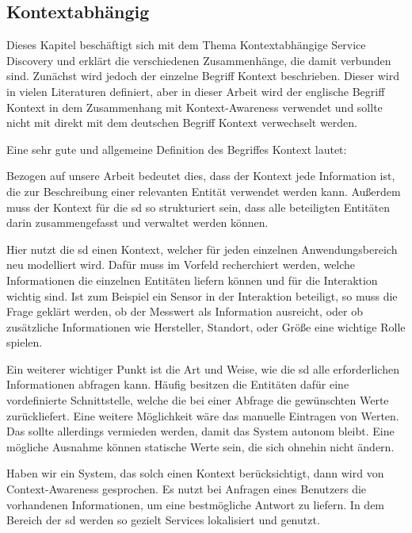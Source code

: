 \subsection{Kontextabhängig}\label{subsec:contextawaresd}

Dieses Kapitel beschäftigt sich mit dem Thema Kontextabhängige Service Discovery
und erklärt die verschiedenen Zusammenhänge, die damit verbunden sind. Zunächst wird jedoch der einzelne Begriff Kontext beschrieben.
Dieser wird in vielen Literaturen definiert, aber in dieser Arbeit wird der englische Begriff Kontext in dem Zusammenhang mit Kontext-Awareness verwendet und sollte nicht mit direkt mit dem deutschen Begriff Kontext verwechselt werden.

Eine sehr gute und allgemeine Definition des Begriffes Kontext lautet: 

Bezogen auf unsere Arbeit bedeutet dies, dass der Kontext jede Information ist, die zur Beschreibung einer relevanten Entität verwendet werden kann. Außerdem muss der Kontext für die \gls{sd} so strukturiert sein, dass alle beteiligten Entitäten darin zusammengefasst und verwaltet werden können.

Hier nutzt die \gls{sd} einen Kontext, welcher für jeden einzelnen Anwendungsbereich neu modelliert wird. Dafür muss im Vorfeld recherchiert werden, welche Informationen die einzelnen Entitäten liefern können und für die Interaktion wichtig sind.
Ist zum Beispiel ein Sensor in der Interaktion beteiligt, so muss die Frage geklärt werden, ob der Messwert als Information ausreicht, oder ob zusätzliche Informationen wie Hersteller, Standort, oder Größe eine wichtige Rolle spielen.

Ein weiterer wichtiger Punkt ist die Art und Weise, wie die \gls{sd} alle erforderlichen Informationen abfragen kann. Häufig besitzen die Entitäten dafür eine vordefinierte Schnittstelle, welche die bei einer Abfrage die gewünschten Werte zurückliefert.
Eine weitere Möglichkeit wäre das manuelle Eintragen von Werten. Das sollte allerdings vermieden werden, damit das System autonom bleibt. Eine mögliche Ausnahme können statische Werte sein, die sich ohnehin nicht ändern.

Haben wir ein System, das solch einen Kontext berücksichtigt, dann wird von Context-Awareness gesprochen. Es nutzt bei Anfragen eines Benutzers die vorhandenen Informationen, um eine bestmögliche Antwort zu liefern.
In dem Bereich der \gls{sd} werden so gezielt Services lokalisiert und genutzt.

